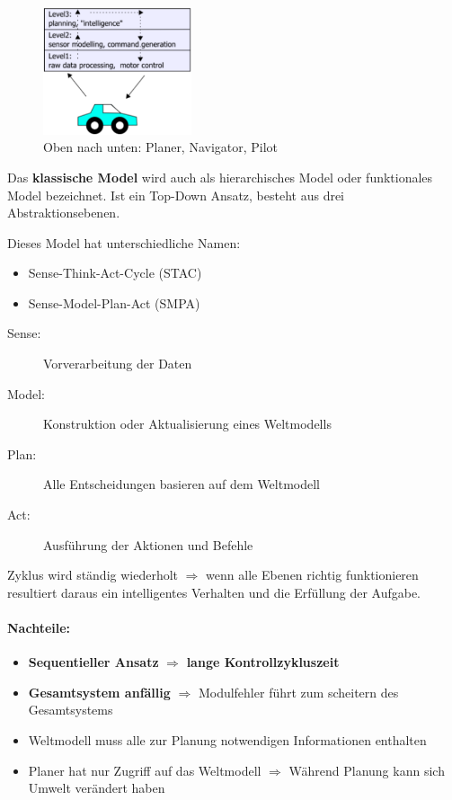 {
\begin{figure}
	\centering
	\includegraphics[width=0.39\textwidth]{Resources/PNG/ClassicModell.png}
	\caption{Oben nach unten: Planer, Navigator, Pilot}
\end{figure}

Das \textbf{klassische Model} wird auch als hierarchisches Model oder
funktionales Model bezeichnet. Ist ein Top-Down Ansatz, besteht aus drei
Abstraktionsebenen.

Dieses Model hat unterschiedliche Namen:
\begin{itemize}
	\item Sense-Think-Act-Cycle (STAC)
	\item Sense-Model-Plan-Act (SMPA)
\end{itemize}

\begin{description}
	\item[Sense:] \small Vorverarbeitung der Daten
	\item[Model:] \small Konstruktion oder Aktualisierung eines Weltmodells
	\item[Plan:] \small Alle Entscheidungen basieren auf dem Weltmodell
	\item[Act:] \small Ausführung der Aktionen und Befehle
\end{description}

Zyklus wird ständig wiederholt $\Rightarrow$ wenn alle Ebenen richtig
funktionieren resultiert daraus ein intelligentes Verhalten und die Erfüllung
der Aufgabe.

}

\paragraph{Nachteile:}
\begin{itemize}
	\item \textbf{Sequentieller Ansatz} $\Rightarrow$ \textbf{lange
		Kontrollzykluszeit}
	\item \textbf{Gesamtsystem anfällig} $\Rightarrow$ Modulfehler führt zum
		scheitern des Gesamtsystems
	\item Weltmodell muss alle zur Planung notwendigen Informationen enthalten
	\item Planer hat nur Zugriff auf das Weltmodell $\Rightarrow$ Während Planung
		kann sich Umwelt verändert haben
\end{itemize}

